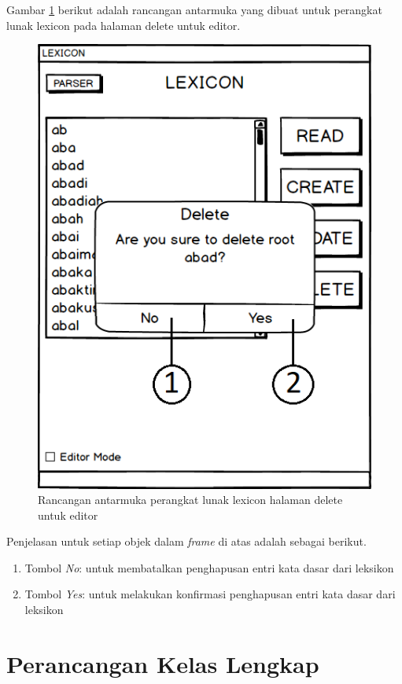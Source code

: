 Gambar \ref{mockup-lexicon-delete-editor} berikut adalah rancangan antarmuka yang dibuat untuk perangkat lunak lexicon pada halaman delete untuk editor.

\begin{figure}[H]
\centering
\includegraphics[scale=0.8]{Gambar/mockup-lexicon-delete-editor}
\caption{Rancangan antarmuka perangkat lunak lexicon halaman delete untuk editor} 
\label{mockup-lexicon-delete-editor}
\end{figure}

Penjelasan untuk setiap objek dalam \textit{frame} di atas adalah sebagai berikut.

\begin{enumerate}
	\item Tombol \textit{No}: untuk membatalkan penghapusan entri kata dasar dari leksikon
	\item Tombol \textit{Yes}: untuk melakukan konfirmasi penghapusan entri kata dasar dari leksikon
\end{enumerate}


\section{Perancangan Kelas Lengkap}
\label{sec:DiagramKelasLengkap}

